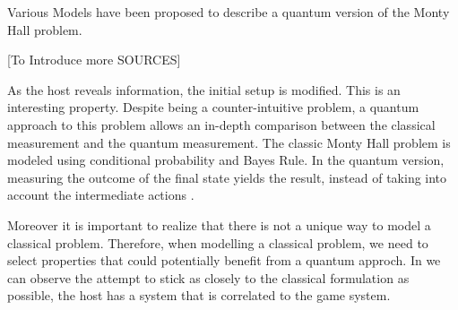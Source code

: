 Various Models have been proposed to describe a quantum version of the Monty Hall problem.

[To Introduce more SOURCES]





As the host reveals information, the initial setup is modified. This is an interesting property. Despite being a counter-intuitive problem, a quantum approach to this problem allows an in-depth comparison between the classical measurement and the quantum measurement. The classic Monty Hall problem is modeled using conditional probability and Bayes Rule. In the quantum version, measuring the outcome of the final state yields the result, instead of taking into account the intermediate actions \cite{Fra2011}.

Moreover it is important to realize that there is not a unique way to model a classical problem\cite{Gill2002}. Therefore, when modelling a classical problem, we need to select properties that could potentially benefit from a quantum approch. In \cite{Gill2002} we can observe the attempt to stick as closely to the classical formulation as possible, the host has a system that is correlated to the game system.







